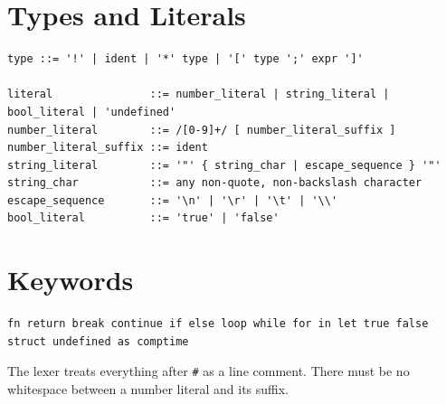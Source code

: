 \section{Types and Literals}

\begin{lstlisting}[caption={Type and literal grammar}]
type ::= '!' | ident | '*' type | '[' type ';' expr ']'

literal               ::= number_literal | string_literal | bool_literal | 'undefined'
number_literal        ::= /[0-9]+/ [ number_literal_suffix ]
number_literal_suffix ::= ident
string_literal        ::= '"' { string_char | escape_sequence } '"'
string_char           ::= any non-quote, non-backslash character
escape_sequence       ::= '\n' | '\r' | '\t' | '\\'
bool_literal          ::= 'true' | 'false'
\end{lstlisting}

\section{Keywords}

\begin{lstlisting}[caption={Reserved keywords}]
fn return break continue if else loop while for in let true false
struct undefined as comptime
\end{lstlisting}

The lexer treats everything after \texttt{\#} as a line comment. There must be
no whitespace between a number literal and its suffix.
